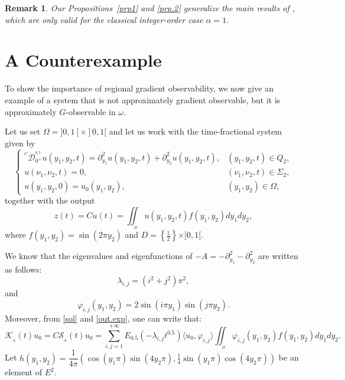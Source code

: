 \documentclass{article}
\newtheorem{remark}[theorem]{Remark}
\begin{document}
\begin{remark}
Our Propositions~\ref{prp1} and \ref{prp.2}
generalize the main results of \cite{zerrik.grd.2003}, 
which are only valid for the classical integer-order case $\alpha=1$.
\end{remark}


\section{A Counterexample}
\label{sec:3}

To show the importance of regional gradient observability, 
we now give an example of a system that is not approximately 
gradient observable, but it is approximately 
$G$-observable in $\omega$.

Let us set $\Omega = ]0,1[\times]0,1[$ and let us work 
with the time-fractional system given by
\begin{equation}
\label{sys.exp}
\left\{\begin{array}{llll}
^{^C}\mathcal{D}_{0^+}^{^{0.5}}u(y_1,y_2,t) 
=  \partial_{y_1}^2u(y_1,y_2,t) + \partial_{y_2}^2u(y_1,y_2,t),  
& (y_1,y_2,t)\in Q_2, \\ 
u(\nu_1,\nu_2,t) = 0,  & (\nu_1,\nu_2,t)\in \Sigma_2, \\
u(y_1,y_2,0) = u_0(y_1,y_2),  & (y_1,y_2)\in\Omega,
\end{array}\right.
\end{equation}
together with the output
\begin{equation}
\label{out.exp}
z(t) = Cu(t) 
= \displaystyle\iint_{_D}u(y_1,y_2,t)f(y_1,y_2)dy_1dy_2,
\end{equation}
where $f(y_1,y_2) = \sin(2\pi y_2)$ and 
$D = \left\{\frac{1}{2}\right\}\times]0,1[$.

We know that the eigenvalues and eigenfunctions of 
$-A = -\partial_{y_1}^2 - \partial_{y_2}^2$ are written as follows:
$$
\lambda_{i,j} = (i^2 + j^2)\pi^2,
$$
and 
$$
\varphi_{i,j}(y_1,y_2) = 2\sin(i\pi y_1)\sin(j\pi y_2).
$$ 
Moreover, from \eqref{sol} and \eqref{out.exp}, one can write that:
\begin{equation}
\label{K_alp_count}
\mathcal{K}_{_\alpha}(t)u_0 = C \mathcal{S}_{_\alpha}(t)u_0 
= \displaystyle\sum_{i,j=1}^{+\infty}E_{0.5}(-\lambda_{i,j}t^{0.5})
\langle u_0,\varphi_{i,j}\rangle 
\displaystyle\iint_{_D}\varphi_{i,j}(y_1,y_2)f(y_1,y_2)dy_1dy_2.
\end{equation}
Let $h(y_1,y_2) = \dfrac{1}{4\pi}\left(\cos(y_1\pi)\sin(4y_2\pi), 
\frac{1}{4}\sin(y_1\pi)\cos(4y_2\pi)\right)$ be an element of $E^2$.
\end{document}
